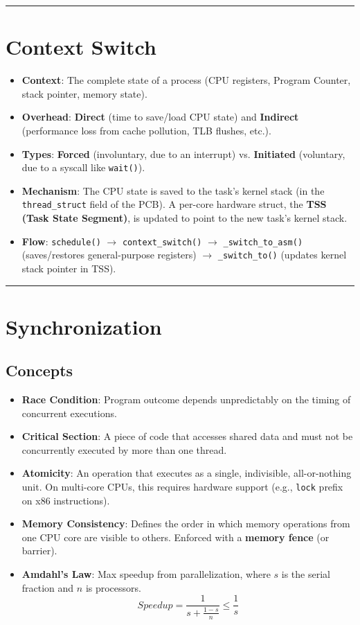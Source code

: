 \documentclass[8pt,a4paper]{article}
\newcommand{\sectiondivider}{\vspace{4pt}\hrule\vspace{4pt}}
\begin{document}
\begin{multicols}{2}
\sectiondivider
\section*{Context Switch}
\begin{itemize}
    \item \textbf{Context}: The complete state of a process (CPU registers, Program Counter, stack pointer, memory state).
    \item \textbf{Overhead}: \textbf{Direct} (time to save/load CPU state) and \textbf{Indirect} (performance loss from cache pollution, TLB flushes, etc.).
    \item \textbf{Types}: \textbf{Forced} (involuntary, due to an interrupt) vs. \textbf{Initiated} (voluntary, due to a syscall like \texttt{wait()}).
    \item \textbf{Mechanism}: The CPU state is saved to the task's kernel stack (in the \texttt{thread\_struct} field of the PCB). A per-core hardware struct, the \textbf{TSS (Task State Segment)}, is updated to point to the new task's kernel stack.
    \item \textbf{Flow}: \texttt{schedule()} $\to$ \texttt{context\_switch()} $\to$ \texttt{\_switch\_to\_asm()} (saves/restores general-purpose registers) $\to$ \texttt{\_switch\_to()} (updates kernel stack pointer in TSS).
\end{itemize}

\sectiondivider
\section*{Synchronization}
\subsection*{Concepts}
\begin{itemize}
    \item \textbf{Race Condition}: Program outcome depends unpredictably on the timing of concurrent executions.
    \item \textbf{Critical Section}: A piece of code that accesses shared data and must not be concurrently executed by more than one thread.
    \item \textbf{Atomicity}: An operation that executes as a single, indivisible, all-or-nothing unit. On multi-core CPUs, this requires hardware support (e.g., \texttt{lock} prefix on x86 instructions).
    \item \textbf{Memory Consistency}: Defines the order in which memory operations from one CPU core are visible to others. Enforced with a \textbf{memory fence} (or barrier).
    \item \textbf{Amdahl's Law}: Max speedup from parallelization, where $s$ is the serial fraction and $n$ is processors.
    $$ Speedup = \frac{1}{s + \frac{1-s}{n}} \le \frac{1}{s} $$
\end{itemize}


\end{multicols}
\end{document}
